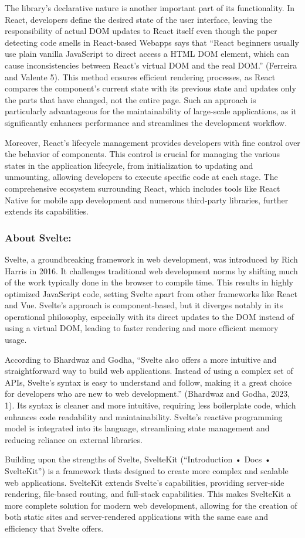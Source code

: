 The library's declarative nature is another important part of its functionality. In React, developers define the desired state of the user interface, leaving the responsibility of actual DOM updates to React itself even though the paper detecting code smells in React-based Webapps says that “React beginners usually use plain vanilla JavaScript to direct access a HTML DOM element, which can cause inconsistencies between React’s virtual DOM and the real DOM.” (Ferreira and Valente 5). This method ensures efficient rendering processes, as React compares the component's current state with its previous state and updates only the parts that have changed, not the entire page. Such an approach is particularly advantageous for the maintainability of large-scale applications, as it significantly enhances performance and streamlines the development workflow.

Moreover, React's lifecycle management provides developers with fine control over the behavior of components. This control is crucial for managing the various states in the application lifecycle, from initialization to updating and unmounting, allowing developers to execute specific code at each stage. The comprehensive ecosystem surrounding React, which includes tools like React Native for mobile app development and numerous third-party libraries, further extends its capabilities.

\subsubsection{About Svelte:}

Svelte, a groundbreaking framework in web development, was introduced by Rich Harris in 2016. It challenges traditional web development norms by shifting much of the work typically done in the browser to compile time. This results in highly optimized JavaScript code, setting Svelte apart from other frameworks like React and Vue. Svelte's approach is component-based, but it diverges notably in its operational philosophy, especially with its direct updates to the DOM instead of using a virtual DOM, leading to faster rendering and more efficient memory usage.

According to Bhardwaz and Godha, “Svelte also offers a more intuitive and straightforward way to build web applications. Instead of using a complex set of APIs, Svelte's syntax is easy to understand and follow, making it a great choice for developers who are new to web development.” (Bhardwaz and Godha, 2023, 1). Its syntax is cleaner and more intuitive, requiring less boilerplate code, which enhances code readability and maintainability. Svelte's reactive programming model is integrated into its language, streamlining state management and reducing reliance on external libraries.

Building upon the strengths of Svelte, SvelteKit (“Introduction • Docs • SvelteKit”) is a framework thats designed to create more complex and scalable web applications. SvelteKit extends Svelte's capabilities, providing server-side rendering, file-based routing, and full-stack capabilities. This makes SvelteKit a more complete solution for modern web development, allowing for the creation of both static sites and server-rendered applications with the same ease and efficiency that Svelte offers.
